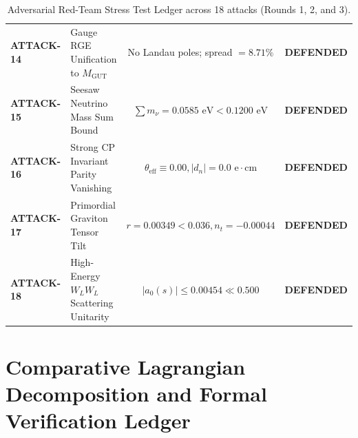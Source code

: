 \documentclass[11pt,reqno]{amsart}
\theoremstyle{definition}
\begin{document}
\begin{table}[h!]
{\begin{tabular}{@{}llcc@{}}
\textbf{ATTACK-14} & Gauge RGE Unification to $M_{\mathrm{GUT}}$ & No Landau poles; spread $= 8.71\%$ & \textbf{DEFENDED} \\
\textbf{ATTACK-15} & Seesaw Neutrino Mass Sum Bound & $\sum m_\nu = 0.0585\text{ eV} < 0.1200\text{ eV}$ & \textbf{DEFENDED} \\
\textbf{ATTACK-16} & Strong CP Invariant Parity Vanishing & $\theta_{\mathrm{eff}} \equiv 0.00, |d_n| = 0.0\text{ e}\cdot\text{cm}$ & \textbf{DEFENDED} \\
\textbf{ATTACK-17} & Primordial Graviton Tensor Tilt & $r = 0.00349 < 0.036, n_t = -0.00044$ & \textbf{DEFENDED} \\
\textbf{ATTACK-18} & High-Energy $W_L W_L$ Scattering Unitarity & $|a_0(s)| \le 0.00454 \ll 0.500$ & \textbf{DEFENDED} \\
\bottomrule
\end{tabular}
}
\caption{Adversarial Red-Team Stress Test Ledger across 18 attacks (Rounds 1, 2, and 3).}
\label{tab:adversarial_ledger_table}
\end{table}

\section{Comparative Lagrangian Decomposition and Formal Verification Ledger}
\end{document}
